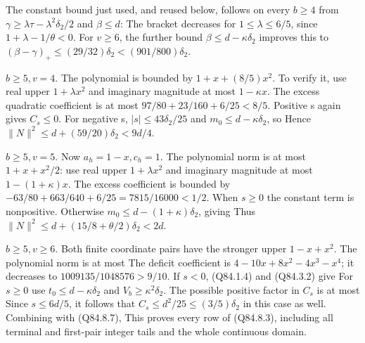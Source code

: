 The constant bound just used, and reused below, follows on every \(b\ge 4\)
from \(\gamma\ge\lambda\tau-\lambda^2\delta_2/2\) and \(\beta\le d\):
The bracket decreases for \(1\le\lambda\le6/5\), since
\(1+\lambda-1/\theta<0\). For \(v\ge 6\), the further bound
\(\beta\le d-\kappa \delta_2\) improves this to
\((\beta-\gamma)_+\le(29/32)\delta_2<(901/800)\delta_2\).

\(b\ge 5,\allowbreak  v=4\). The polynomial is bounded by
\(1+x+(8/5)x^2\). To verify it, use real upper \(1+\lambda x^2\)
and imaginary magnitude at most \(1-\kappa x\). The excess quadratic
coefficient is at most
\(97/80+23/160+6/25<8/5\).
Positive s again gives \(C_s\le 0\). For negative s, \(|s|\le43\delta_2/25\)
and \(m_0\le d-\kappa \delta_2\), so
Hence \(\|N\|^2\le d+(59/20)\delta_2<9d/4\).

\(b\ge 5,\allowbreak  v=5\). Now \(a_h=1-x,\allowbreak  c_h=1\). The polynomial norm is at most
\(1+x+x^2/2\): use real upper \(1+\lambda x^2\) and imaginary
magnitude at most \(1-(1+\kappa)x\). The excess coefficient is bounded
by \(-63/80+663/640+6/25=7815/16000<1/2\).
When \(s\ge 0\) the constant term is nonpositive. Otherwise
\(m_0\le d-(1+\kappa)\delta_2\), giving
Thus \(\|N\|^2\le d+(15/8+\theta/2)\delta_2<2d\).

\(b\ge 5,\allowbreak  v\ge 6\). Both finite coordinate pairs have the stronger upper
\(1-x+x^2\). The polynomial norm is at most
The deficit coefficient is
\(4-10x+8x^2-4x^3-x^4\); it decreases to
\(1009135/1048576>9/10\). If \(s<0\), (Q84.1.4) and (Q84.3.2) give
For \(s\ge 0\) use \(t_0\le d-\kappa \delta_2\) and
\(V_b\ge\kappa^2\delta_2\). The possible positive factor
in \(C_s\) is at most
Since \(s\le 6d/5\), it follows that \(C_s\le d^2/25\le(3/5)\delta_2\)
in this case as well. Combining with (Q84.8.7),
This proves every row of (Q84.8.3), including all terminal and first-pair
integer tails and the whole continuous domain.

